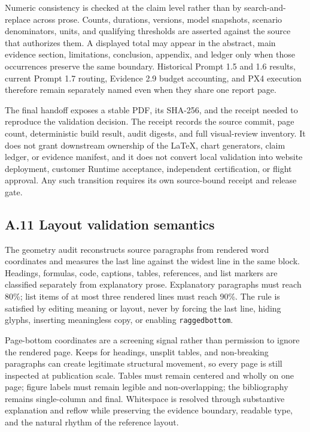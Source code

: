 Numeric consistency is checked at the claim level rather than by
search-and-replace across prose. Counts, durations, versions, model
snapshots, scenario denominators, units, and qualifying thresholds are
asserted against the source that authorizes them. A displayed total may
appear in the abstract, main evidence section, limitations, conclusion,
appendix, and ledger only when those occurrences preserve the same
boundary. Historical Prompt 1.5 and 1.6 results, current Prompt 1.7
routing, Evidence 2.9 budget accounting, and PX4 execution therefore
remain separately named even when they share one report page.

The final handoff exposes a stable PDF, its SHA-256, and the receipt
needed to reproduce the validation decision. The receipt records the
source commit, page count, deterministic build result, audit digests, and
full visual-review inventory. It does not grant downstream ownership of
the LaTeX, chart generators, claim ledger, or evidence manifest, and it
does not convert local validation into website deployment, customer
Runtime acceptance, independent certification, or flight approval. Any
such transition requires its own source-bound receipt and release gate.

\subsection{\texorpdfstring{\textbf{A.11 Layout validation
semantics}}{A.11 Layout validation semantics}}\label{a.11-layout-validation-semantics}

The geometry audit reconstructs source paragraphs from rendered word
coordinates and measures the last line against the widest line in the
same block. Headings, formulas, code, captions, tables, references, and
list markers are classified separately from explanatory prose.
Explanatory paragraphs must reach 80\%; list items of at most three
rendered lines must reach 90\%. The rule is satisfied by editing meaning
or layout, never by forcing the last line, hiding glyphs, inserting
meaningless copy, or enabling \texttt{raggedbottom}.

Page-bottom coordinates are a screening signal rather than permission to
ignore the rendered page. Keeps for headings, unsplit tables, and
non-breaking paragraphs can create legitimate structural movement, so
every page is still inspected at publication scale. Tables must remain
centered and wholly on one page; figure labels must remain legible and
non-overlapping; the bibliography remains single-column and final.
Whitespace is resolved through substantive explanation and reflow while
preserving the evidence boundary, readable type, and the natural rhythm
of the reference layout.

